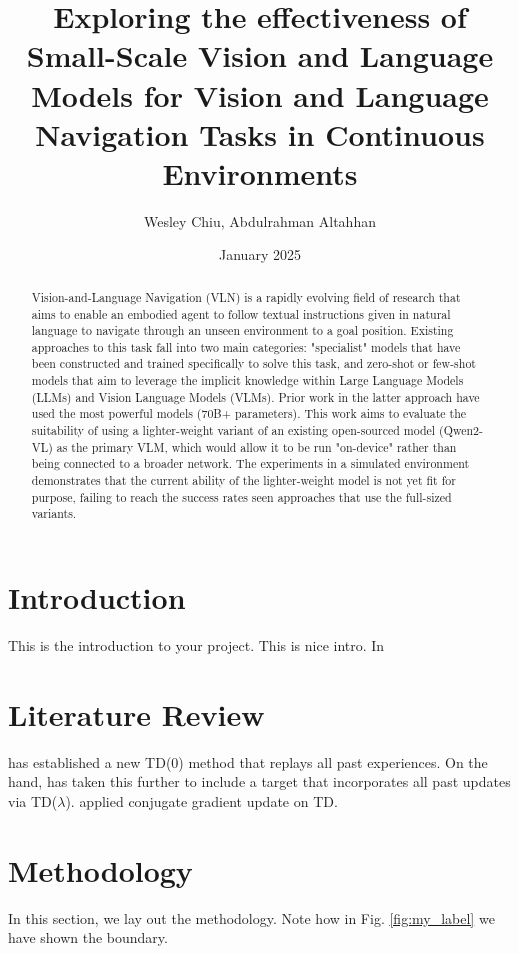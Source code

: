 \documentclass{svproc}
\title{Exploring the effectiveness of Small-Scale Vision and Language Models for Vision and Language Navigation Tasks in Continuous Environments}
\author{Wesley Chiu, Abdulrahman Altahhan}
\institute{University of Leeds, School of Computing, ODL MSc in AI, UK.}
\date{January 2025}
\begin{document}
\maketitle

\begin{abstract}
    Vision-and-Language Navigation (VLN) is a rapidly evolving field of research that aims to enable an embodied agent to follow textual instructions given in natural language
    to navigate through an unseen environment to a goal position. Existing approaches to this task fall into two main categories: "specialist" models that have been
    constructed and trained specifically to solve this task, and zero-shot or few-shot models that aim to leverage the implicit knowledge within Large Language Models (LLMs) and Vision 
    Language Models (VLMs). Prior work in the latter approach have used the most powerful models (70B+ parameters). This work aims to evaluate the suitability of using a lighter-weight 
    variant of an existing open-sourced model (Qwen2-VL) as the primary VLM, which would allow it to be run "on-device" rather than being connected to a broader network.
    The experiments in a simulated environment demonstrates that the current ability of the lighter-weight model is not yet fit for purpose, failing to reach the success rates 
    seen approaches that use the full-sized variants.
    
\end{abstract}

\section{Introduction}
    This is the introduction to your project. This is nice intro. In \cite{NuclearPlant}
    
\section{Literature Review}
    \cite{TD0-Replay} has established a new TD(0) method that replays all past experiences. On the hand, \cite{TD-Replay} has taken this further to include a target that incorporates all past updates via TD($\lambda$). \cite{ConjugateTD} applied conjugate gradient update on TD.


\section{Methodology}
    In this section, we lay out the methodology. Note how in Fig. \ref{fig:my_label} we have shown the boundary.
\end{document}
